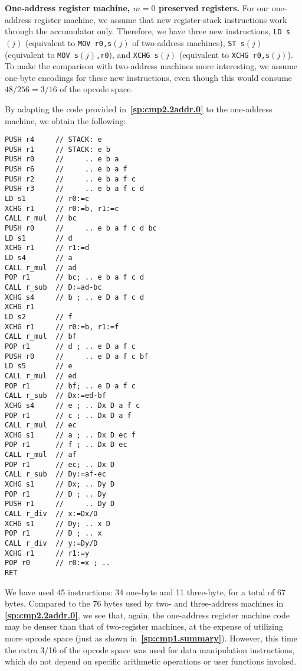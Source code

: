 \documentclass[12pt,oneside]{article}
\def\makepoint#1{\medbreak\noindent{\bf #1.\ }}
\def\nxsubpoint{\refstepcounter{subsubsection}%
  \smallbreak\makepoint{\thesubsubsection}}
\def\refpoint#1{{\rm\textbf{\ref{#1}}}}
\let\ptref=\refpoint
\def\emb#1{\textbf{#1.}}
\begin{document}
\nxsubpoint\label{sp:cmp2.1addr.0}\emb{One-address register machine, $m=0$ preserved registers}
For our one-address register machine, we assume that new register-stack instructions work through the accumulator only. Therefore, we have three new instructions, \texttt{LD s$(j)$} (equivalent to \texttt{MOV r0,s$(j)$} of two-address machines), \texttt{ST s$(j)$} (equivalent to \texttt{MOV s$(j)$,r0}), and \texttt{XCHG s$(j)$} (equivalent to \texttt{XCHG r0,s$(j)$}). To make the comparison with two-address machines more interesting, we assume one-byte encodings for these new instructions, even though this would consume $48/256=3/16$ of the opcode space.

By adapting the code provided in~\ptref{sp:cmp2.2addr.0} to the one-address machine, we obtain the following:
\begin{verbatim}
PUSH r4     // STACK: e
PUSH r1     // STACK: e b
PUSH r0     //     .. e b a
PUSH r6     //     .. e b a f
PUSH r2     //     .. e b a f c
PUSH r3     //     .. e b a f c d
LD s1       // r0:=c
XCHG r1     // r0:=b, r1:=c
CALL r_mul  // bc
PUSH r0     //     .. e b a f c d bc
LD s1       // d
XCHG r1     // r1:=d
LD s4       // a
CALL r_mul  // ad
POP r1      // bc; .. e b a f c d
CALL r_sub  // D:=ad-bc
XCHG s4     // b ; .. e D a f c d
XCHG r1
LD s2       // f
XCHG r1     // r0:=b, r1:=f
CALL r_mul  // bf
POP r1      // d ; .. e D a f c
PUSH r0     //     .. e D a f c bf
LD s5       // e
CALL r_mul  // ed
POP r1      // bf; .. e D a f c
CALL r_sub  // Dx:=ed-bf
XCHG s4     // e ; .. Dx D a f c
POP r1      // c ; .. Dx D a f
CALL r_mul  // ec
XCHG s1     // a ; .. Dx D ec f
POP r1      // f ; .. Dx D ec
CALL r_mul  // af
POP r1      // ec; .. Dx D
CALL r_sub  // Dy:=af-ec
XCHG s1     // Dx; .. Dy D
POP r1      // D ; .. Dy
PUSH r1     //     .. Dy D
CALL r_div  // x:=Dx/D
XCHG s1     // Dy; .. x D
POP r1      // D ; .. x
CALL r_div  // y:=Dy/D
XCHG r1     // r1:=y
POP r0      // r0:=x ; ..
RET
\end{verbatim}
We have used 45 instructions: 34 one-byte and 11 three-byte, for a total of 67 bytes. Compared to the 76 bytes used by two- and three-address machines in \ptref{sp:cmp2.2addr.0}, we see that, again, the one-address register machine code may be denser than that of two-register machines, at the expense of utilizing more opcode space (just as shown in~\ptref{sp:cmp1.summary}). However, this time the extra 3/16 of the opcode space was used for data manipulation instructions, which do not depend on specific arithmetic operations or user functions invoked.
\end{document}
